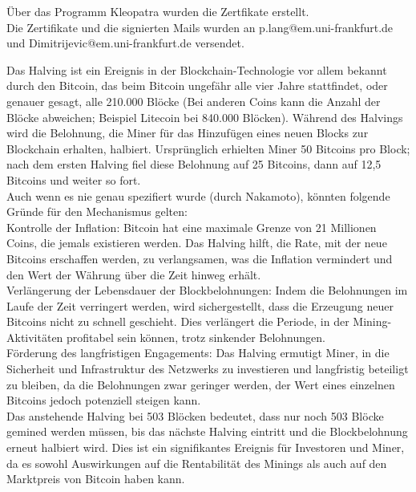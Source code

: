 \documentclass[german]{uebung}
\begin{document}
\begin{exercise}{1.1}
	Über das Programm Kleopatra wurden die Zertfikate erstellt.\\
	Die Zertifikate und die signierten Mails wurden an p.lang@em.uni-frankfurt.de und Dimitrijevic@em.uni-frankfurt.de versendet.
\end{exercise}

\begin{exercise}{1.2}
	Das Halving ist ein Ereignis in der Blockchain-Technologie vor allem bekannt durch den Bitcoin, das beim Bitcoin ungefähr alle vier Jahre stattfindet, oder genauer gesagt, alle 210.000 Blöcke (Bei anderen Coins kann die Anzahl der Blöcke abweichen; Beispiel Litecoin bei 840.000 Blöcken). Während des Halvings wird die Belohnung, die Miner für das Hinzufügen eines neuen Blocks zur Blockchain erhalten, halbiert. Ursprünglich erhielten Miner 50 Bitcoins pro Block; nach dem ersten Halving fiel diese Belohnung auf 25 Bitcoins, dann auf 12,5 Bitcoins und weiter so fort.\\
	Auch wenn es nie genau spezifiert wurde (durch Nakamoto), könnten folgende Gründe für den Mechanismus gelten:\\
	Kontrolle der Inflation: Bitcoin hat eine maximale Grenze von 21 Millionen Coins, die jemals existieren werden. Das Halving hilft, die Rate, mit der neue Bitcoins erschaffen werden, zu verlangsamen, was die Inflation vermindert und den Wert der Währung über die Zeit hinweg erhält.\\
	Verlängerung der Lebensdauer der Blockbelohnungen: Indem die Belohnungen im Laufe der Zeit verringert werden, wird sichergestellt, dass die Erzeugung neuer Bitcoins nicht zu schnell geschieht. Dies verlängert die Periode, in der Mining-Aktivitäten profitabel sein können, trotz sinkender Belohnungen.\\
	Förderung des langfristigen Engagements: Das Halving ermutigt Miner, in die Sicherheit und Infrastruktur des Netzwerks zu investieren und langfristig beteiligt zu bleiben, da die Belohnungen zwar geringer werden, der Wert eines einzelnen Bitcoins jedoch potenziell steigen kann.\\
	Das anstehende Halving bei 503 Blöcken bedeutet, dass nur noch 503 Blöcke gemined werden müssen, bis das nächste Halving eintritt und die Blockbelohnung erneut halbiert wird. Dies ist ein signifikantes Ereignis für Investoren und Miner, da es sowohl Auswirkungen auf die Rentabilität des Minings als auch auf den Marktpreis von Bitcoin haben kann.
\end{exercise}
\end{document}
